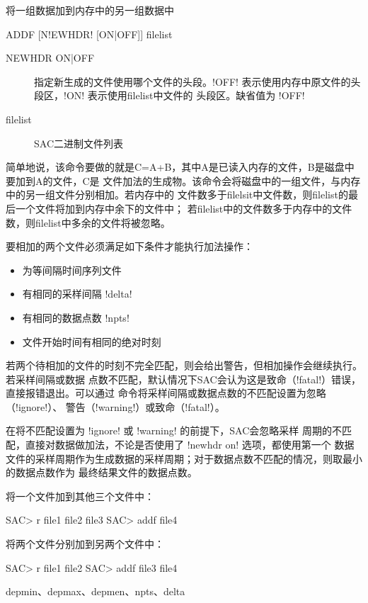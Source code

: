 \label{cmd:addf}

将一组数据加到内存中的另一组数据中

\begin{SACSTX}
ADDF [N!EWHDR! [ON|OFF]] filelist
\end{SACSTX}

\begin{description}
\item [NEWHDR ON|OFF] 指定新生成的文件使用哪个文件的头段。!OFF!
    表示使用内存中原文件的头段区，!ON! 表示使用filelist中文件的
    头段区。缺省值为 !OFF!
\item [filelist] SAC二进制文件列表
\end{description}

简单地说，该命令要做的就是C=A+B，其中A是已读入内存的文件，B是磁盘中要加到A的文件，C是
文件加法的生成物。该命令会将磁盘中的一组文件，与内存中的另一组文件分别相加。若内存中的
文件数多于filelsit中文件数，则filelist的最后一个文件将加到内存中余下的文件中；
若filelist中的文件数多于内存中的文件数，则filelist中多余的文件将被忽略。

要相加的两个文件必须满足如下条件才能执行加法操作：
\begin{itemize}
\item 为等间隔时间序列文件
\item 有相同的采样间隔 !delta!
\item 有相同的数据点数 !npts!
\item 文件开始时间有相同的绝对时刻
\end{itemize}

若两个待相加的文件的时刻不完全匹配，则会给出警告，但相加操作会继续执行。若采样间隔或数据
点数不匹配，默认情况下SAC会认为这是致命（!fatal!）错误，直接报错退出。可以通过 
 命令将采样间隔或数据点数的不匹配设置为忽略（!ignore!）、
警告（!warning!）或致命（!fatal!）。

在将不匹配设置为 !ignore! 或 !warning! 的前提下，SAC会忽略采样
周期的不匹配，直接对数据做加法，不论是否使用了 !newhdr on! 选项，都使用第一个
数据文件的采样周期作为生成数据的采样周期；对于数据点数不匹配的情况，则取最小的数据点数作为
最终结果文件的数据点数。

将一个文件加到其他三个文件中：
\begin{SACCode}
SAC> r file1 file2 file3
SAC> addf file4
\end{SACCode}

将两个文件分别加到另两个文件中：
\begin{SACCode}
SAC> r file1 file2
SAC> addf file3 file4
\end{SACCode}

depmin、depmax、depmen、npts、delta
